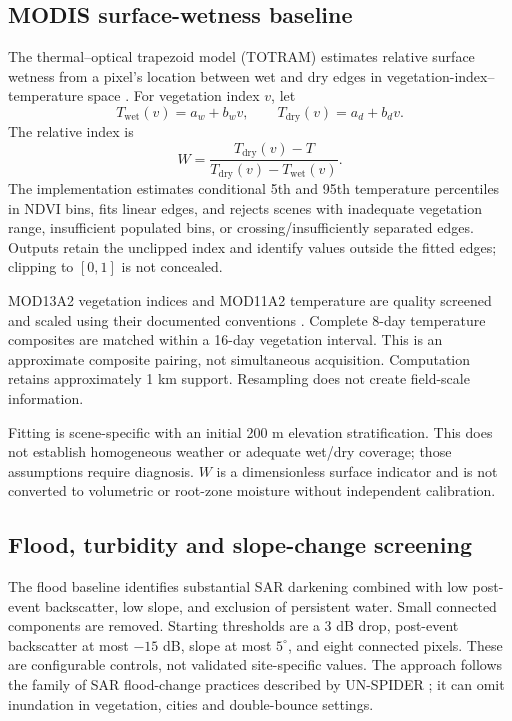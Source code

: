 \documentclass[11pt]{article}
\begin{document}
\subsection{MODIS surface-wetness baseline}
The thermal--optical trapezoid model (TOTRAM) estimates relative surface wetness from a pixel's location between wet and dry edges in vegetation-index--temperature space \cite{trapezoid,sadeghi}. For vegetation index $v$, let
\begin{equation}
T_{\mathrm{wet}}(v)=a_w+b_wv,\qquad
T_{\mathrm{dry}}(v)=a_d+b_dv.
\end{equation}
The relative index is
\begin{equation}
W=\frac{T_{\mathrm{dry}}(v)-T}{T_{\mathrm{dry}}(v)-T_{\mathrm{wet}}(v)}.
\end{equation}
The implementation estimates conditional 5th and 95th temperature percentiles in NDVI bins, fits linear edges, and rejects scenes with inadequate vegetation range, insufficient populated bins, or crossing/insufficiently separated edges. Outputs retain the unclipped index and identify values outside the fitted edges; clipping to $[0,1]$ is not concealed.

MOD13A2 vegetation indices and MOD11A2 temperature are quality screened and scaled using their documented conventions \cite{modis}. Complete 8-day temperature composites are matched within a 16-day vegetation interval. This is an approximate composite pairing, not simultaneous acquisition. Computation retains approximately 1 km support. Resampling does not create field-scale information.

Fitting is scene-specific with an initial 200 m elevation stratification. This does not establish homogeneous weather or adequate wet/dry coverage; those assumptions require diagnosis. $W$ is a dimensionless surface indicator and is not converted to volumetric or root-zone moisture without independent calibration.

\subsection{Flood, turbidity and slope-change screening}
The flood baseline identifies substantial SAR darkening combined with low post-event backscatter, low slope, and exclusion of persistent water. Small connected components are removed. Starting thresholds are a 3 dB drop, post-event backscatter at most $-15$ dB, slope at most $5^\circ$, and eight connected pixels. These are configurable controls, not validated site-specific values. The approach follows the family of SAR flood-change practices described by UN-SPIDER \cite{flood}; it can omit inundation in vegetation, cities and double-bounce settings.
\end{document}
